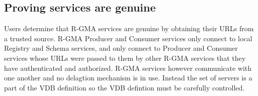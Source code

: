 \subsection{Proving services are genuine}

Users determine that R-GMA services are genuine by obtaining their URLs from
a trusted source. R-GMA Producer and Consumer services only connect to
local Registry and Schema services, and only connect to Producer and Consumer
services whose URLs were passed to them by other R-GMA services that they have
authenticated and authorized. R-GMA services however communicate with one
another and no delagtion mechanism is in use. Instead the set of servers is a
part of the VDB definition so the VDB defintion must be carefully controlled.
